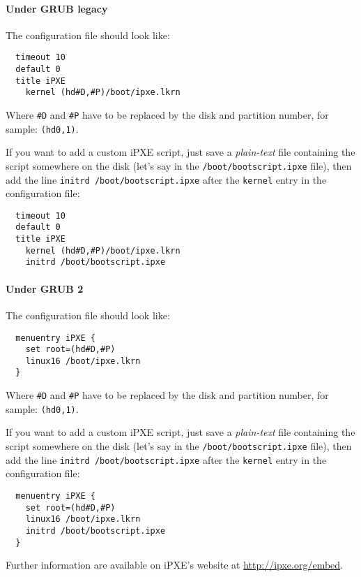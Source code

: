 \documentclass[a4paper,11pt]{article}
\begin{document}
\paragraph{Under GRUB legacy\\}

The configuration file should look like:
\begin{verbatim}
  timeout 10
  default 0
  title iPXE
    kernel (hd#D,#P)/boot/ipxe.lkrn
\end{verbatim}

Where \texttt{\#D} and \texttt{\#P} have to be replaced by the disk and partition number, for sample: \texttt{(hd0,1)}.

If you want to add a custom iPXE script, just save a \emph{plain-text} file containing the script somewhere on the disk (let's say in the \texttt{/boot/bootscript.ipxe} file), then add the line \texttt{initrd /boot/bootscript.ipxe} after the \texttt{kernel} entry in the configuration file:
\begin{verbatim}
  timeout 10
  default 0
  title iPXE
    kernel (hd#D,#P)/boot/ipxe.lkrn
    initrd /boot/bootscript.ipxe
\end{verbatim}

\paragraph{Under GRUB 2\\}

The configuration file should look like:
\begin{verbatim}
  menuentry iPXE {
    set root=(hd#D,#P)
    linux16 /boot/ipxe.lkrn
  }
\end{verbatim}

Where \texttt{\#D} and \texttt{\#P} have to be replaced by the disk and partition number, for sample: \texttt{(hd0,1)}.

If you want to add a custom iPXE script, just save a \emph{plain-text} file containing the script somewhere on the disk (let's say in the \texttt{/boot/bootscript.ipxe} file), then add the line \texttt{initrd /boot/bootscript.ipxe} after the \texttt{kernel} entry in the configuration file:
\begin{verbatim}
  menuentry iPXE {
    set root=(hd#D,#P)
    linux16 /boot/ipxe.lkrn
    initrd /boot/bootscript.ipxe
  }
\end{verbatim}

Further information are available on iPXE's website at \url{http://ipxe.org/embed}.
\end{document}
